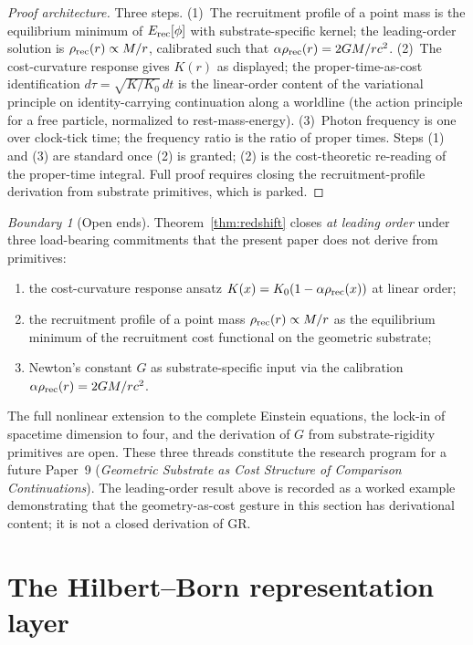 \documentclass[11pt]{article}
\theoremstyle{remark}
\newtheorem{warning}[theorem]{Boundary}
\newcommand{\Erec}{E_{\rm rec}}
\begin{document}
\begin{proof}[Proof architecture]
Three steps.  (1)~The recruitment profile of a point mass is the equilibrium minimum of $\Erec[\phi]$ with substrate-specific kernel; the leading-order solution is $\rho_{\rm rec}(r) \propto M/r$, calibrated such that $\alpha\rho_{\rm rec}(r) = 2GM/rc^2$.  (2)~The cost-curvature response gives $K(r)$ as displayed; the proper-time-as-cost identification $d\tau = \sqrt{K/K_0}\,dt$ is the linear-order content of the variational principle on identity-carrying continuation along a worldline (the action principle for a free particle, normalized to rest-mass-energy).  (3)~Photon frequency is one over clock-tick time; the frequency ratio is the ratio of proper times.  Steps (1) and (3) are standard once (2) is granted; (2) is the cost-theoretic re-reading of the proper-time integral.  Full proof requires closing the recruitment-profile derivation from substrate primitives, which is parked.
\end{proof}

\begin{warning}[Open ends]
Theorem~\ref{thm:redshift} closes \emph{at leading order} under three load-bearing commitments that the present paper does not derive from primitives:
\begin{enumerate}
\item the cost-curvature response ansatz $K(x) = K_0(1 - \alpha\rho_{\rm rec}(x))$ at linear order;
\item the recruitment profile of a point mass $\rho_{\rm rec}(r) \propto M/r$ as the equilibrium minimum of the recruitment cost functional on the geometric substrate;
\item Newton's constant $G$ as substrate-specific input via the calibration $\alpha\rho_{\rm rec}(r) = 2GM/rc^2$.
\end{enumerate}
The full nonlinear extension to the complete Einstein equations, the lock-in of spacetime dimension to four, and the derivation of $G$ from substrate-rigidity primitives are open.  These three threads constitute the research program for a future Paper~9 (\emph{Geometric Substrate as Cost Structure of Comparison Continuations}).  The leading-order result above is recorded as a worked example demonstrating that the geometry-as-cost gesture in this section has derivational content; it is not a closed derivation of GR.
\end{warning}

\section{The Hilbert--Born representation layer}
\end{document}
